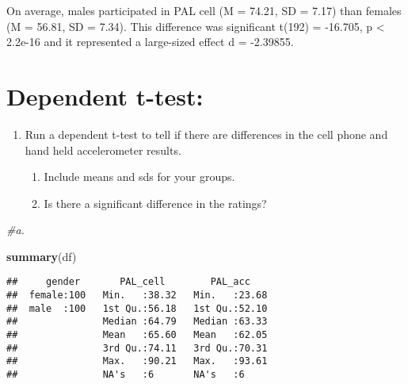 \documentclass[
]{article}
\newenvironment{Shaded}{\begin{snugshade}}{\end{snugshade}}
\newcommand{\CommentTok}[1]{\textcolor[rgb]{0.56,0.35,0.01}{\textit{#1}}}
\newcommand{\KeywordTok}[1]{\textcolor[rgb]{0.13,0.29,0.53}{\textbf{#1}}}
\newcommand{\NormalTok}[1]{#1}
\newcommand{\OperatorTok}[1]{\textcolor[rgb]{0.81,0.36,0.00}{\textbf{#1}}}
\providecommand{\tightlist}{%
  \setlength{\itemsep}{0pt}\setlength{\parskip}{0pt}}
\begin{document}
On average, males participated in PAL cell (M = 74.21, SD = 7.17) than
females (M = 56.81, SD = 7.34). This difference was significant t(192) =
-16.705, p \textless{} 2.2e-16 and it represented a large-sized effect d
= -2.39855.

\hypertarget{dependent-t-test}{%
\section{Dependent t-test:}\label{dependent-t-test}}

\begin{enumerate}
\def\labelenumi{\arabic{enumi})}
\setcounter{enumi}{5}
\tightlist
\item
  Run a dependent t-test to tell if there are differences in the cell
  phone and hand held accelerometer results.

  \begin{enumerate}
  \def\labelenumii{\alph{enumii}.}
  \tightlist
  \item
    Include means and sds for your groups.
  \item
    Is there a significant difference in the ratings?
  \end{enumerate}
\end{enumerate}

\begin{Shaded}
\begin{Highlighting}[]
\CommentTok{#a.}

\KeywordTok{summary}\NormalTok{(df)}
\end{Highlighting}
\end{Shaded}

\begin{verbatim}
##     gender       PAL_cell        PAL_acc     
##  female:100   Min.   :38.32   Min.   :23.68  
##  male  :100   1st Qu.:56.18   1st Qu.:52.10  
##               Median :64.79   Median :63.33  
##               Mean   :65.60   Mean   :62.05  
##               3rd Qu.:74.11   3rd Qu.:70.31  
##               Max.   :90.21   Max.   :93.61  
##               NA's   :6       NA's   :6
\end{verbatim}

\begin{Shaded}
\end{Shaded}
\end{document}
